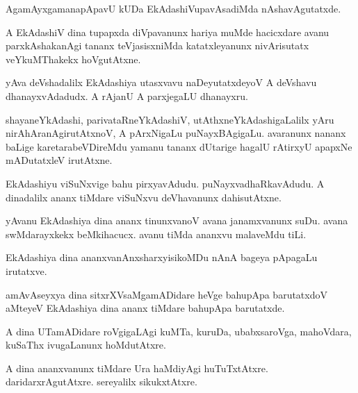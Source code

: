 \begin{mng}
AgamAyxgamanapApavU kUDa EkAdashiVupavAsadiMda nAshavAgutatxde.
\end{mng}

\begin{mng}
A EkAdashiV dina tupapxda diVpavanunx hariya muMde hacicxdare avanu parxkAshakanAgi tananx teVjasisxniMda katatxleyanunx nivArisutatx veYkuMThakekx hoVgutAtxne.
\end{mng}

\begin{mng}
yAva deVshadalilx EkAdashiya utasxvavu naDeyutatxdeyoV A deVshavu dhanayxvAdadudx. A rAjanU A parxjegaLU dhanayxru.
\end{mng}

\begin{mng}
shayaneYkAdashi, parivataRneYkAdashiV, utAthxneYkAdashigaLalilx yAru nirAhAranAgirutAtxnoV, A pArxNigaLu puNayxBAgigaLu. avaranunx nananx baLige karetarabeVDireMdu yamanu tananx dUtarige hagalU rAtirxyU apapxNe mADutatxleV irutAtxne.
\end{mng}

\begin{mng}
EkAdashiyu viSuNxvige bahu pirxyavAdudu. puNayxvadhaRkavAdudu. A dinadalilx ananx tiMdare viSuNxvu deVhavanunx dahisutAtxne.
\end{mng}

\begin{mng}
yAvanu EkAdashiya dina ananx tinunxvanoV avana janamxvanunx suDu. avana swMdarayxkekx beMkihacucx. avanu tiMda ananxvu malaveMdu tiLi.
\end{mng}

\begin{mng}
EkAdashiya dina ananxvanAnxsharxyisikoMDu nAnA bageya pApagaLu irutatxve.
\end{mng}

\begin{mng}
amAvAseyxya dina sitxrXVsaMgamADidare heVge bahupApa barutatxdoV aMteyeV EkAdashiya dina ananx tiMdare bahupApa barutatxde.
\end{mng}

\begin{mng}
A dina UTamADidare roVgigaLAgi kuMTa, kuruDa, ubabxsaroVga, mahoVdara, kuSaThx ivugaLanunx hoMdutAtxre.
\end{mng}

\begin{mng}
A dina ananxvanunx tiMdare Ura haMdiyAgi huTuTxtAtxre. daridarxrAgutAtxre. sereyalilx sikukxtAtxre.
\end{mng}

